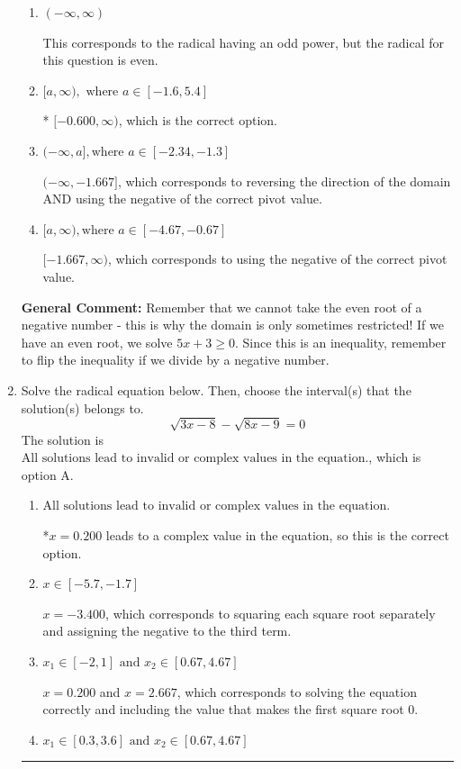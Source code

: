\documentclass{extbook}[14pt]
\newcommand{\litem}[1]{\item #1

\rule{\textwidth}{0.4pt}}
\begin{document}
\begin{enumerate}
{\begin{enumerate}[label=\Alph*.]
 $(-\infty, -0.600]$, which corresponds to reversing the direction of the domain.
\item \( (-\infty, \infty) \)

This corresponds to the radical having an odd power, but the radical for this question is even.
\item \( [a, \infty), \text{ where } a \in [-1.6, 5.4] \)

* $[-0.600, \infty)$, which is the correct option.
\item \( (-\infty, a], \text{where } a \in [-2.34, -1.3] \)

$(-\infty, -1.667]$, which corresponds to reversing the direction of the domain AND using the negative of the correct pivot value.
\item \( [a, \infty), \text{where } a \in [-4.67, -0.67] \)

$[-1.667, \infty)$, which corresponds to using the negative of the correct pivot value.
\end{enumerate}

\textbf{General Comment:} Remember that we cannot take the even root of a negative number - this is why the domain is only sometimes restricted! If we have an even root, we solve $5 x + 3 \geq 0$. Since this is an inequality, remember to flip the inequality if we divide by a negative number.
}
\litem{
Solve the radical equation below. Then, choose the interval(s) that the solution(s) belongs to.
\[ \sqrt{3 x - 8} - \sqrt{8 x - 9} = 0 \]The solution is \( \text{All solutions lead to invalid or complex values in the equation.} \), which is option A.\begin{enumerate}[label=\Alph*.]
\item \( \text{All solutions lead to invalid or complex values in the equation.} \)

*$x = 0.200$ leads to a complex value in the equation, so this is the correct option.
\item \( x \in [-5.7,-1.7] \)

$x = -3.400$, which corresponds to squaring each square root separately and assigning the negative to the third term.
\item \( x_1 \in [-2, 1] \text{ and } x_2 \in [0.67,4.67] \)

$x = 0.200$ and $x = 2.667$, which corresponds to solving the equation correctly and including the value that makes the first square root 0.
\item \( x_1 \in [0.3, 3.6] \text{ and } x_2 \in [0.67,4.67] \)


\end{enumerate}}
\end{enumerate}
\end{document}
